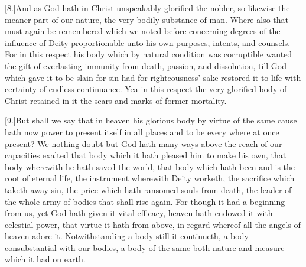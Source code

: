 [8.]And as God hath in Christ unspeakably glorified the nobler, so likewise the meaner part of our nature, the very bodily substance of man. Where also that must again be remembered which we noted before concerning degrees of the  influence of Deity proportionable unto his own purposes, intents, and counsels.
 For in this respect his body which by natural condition was corruptible wanted the gift of everlasting immunity from death, passion, and dissolution, till God which gave it to be slain for sin had for righteousness’ sake restored it to life with certainty of endless continuance. Yea in this respect the very glorified body of Christ retained in it the scars and marks of former mortality.

[9.]But shall we say that in heaven his glorious body by virtue of the same cause hath now power to present itself in all places and to be every where at once present? We nothing doubt but God hath many ways above the reach of our capacities exalted that body which it hath pleased him to make his own, that body wherewith he hath saved the world, that body which hath been and is the root of eternal life, the instrument wherewith Deity worketh, the sacrifice which taketh away sin, the price which hath ransomed souls from death, the leader of the whole army of bodies that shall rise again. For though it had a beginning from us, yet God hath given it vital efficacy, heaven hath endowed it with celestial power, that virtue it hath from above, in regard whereof all the angels of heaven adore it. Notwithstanding a body still it continueth, a body consubstantial with our bodies, a body of the same both nature and measure which it had on earth.

